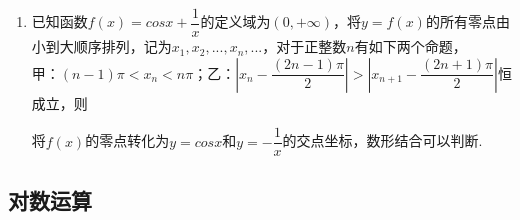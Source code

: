 \begin{enumerate}
    \item 已知函数$f(x) = cosx + \dfrac{1}{x}$的定义域为$(0, +\infty)$，将$y = f(x)$的所有零点由小到大顺序排列，记为$x_1, x_2, ..., x_n, ...$，对于正整数$n$有如下两个命题， \\
    甲：$(n-1)\pi < x_n < n\pi$；乙：$\left|x_n - \dfrac{(2n-1) \pi}{2}\right| > \left|x_{n+1} - \dfrac{(2n+1) \pi}{2}\right|$恒成立，则
    \begin{jieda}
        将$f(x)$的零点转化为$y = cosx$和$y = -\dfrac{1}{x}$的交点坐标，数形结合可以判断.
    \end{jieda}
    \end{enumerate}

    \subsection*{对数运算}
